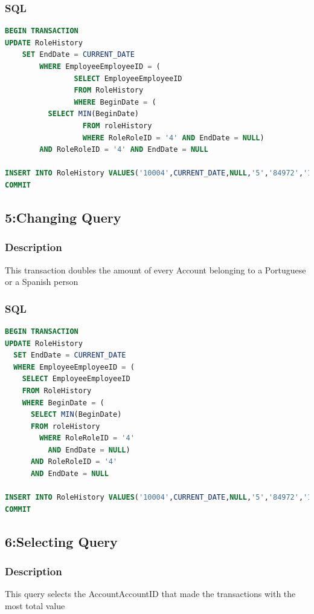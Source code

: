 \documentclass[a4paper, 10pt]{article}
\begin{document}
\subsubsection{SQL}
\begin{lstlisting}[language=SQL]
BEGIN TRANSACTION
UPDATE RoleHistory
	SET EndDate = CURRENT_DATE
		WHERE EmployeeEmployeeID = (
				SELECT EmployeeEmployeeID 
				FROM RoleHistory
				WHERE BeginDate = (
          SELECT MIN(BeginDate)
				  FROM roleHistory
				  WHERE RoleRoleID = '4' AND EndDate = NULL)
        AND RoleRoleID = '4' AND EndDate = NULL

INSERT INTO RoleHistory VALUES('10004',CURRENT_DATE,NULL,'5','84972','16516');
COMMIT
\end{lstlisting}

\subsection{5:Changing Query}
\subsubsection{Description}
This transaction doubles the amount of every Account belonging to a Portuguese or a Spanish person

\subsubsection{SQL}
\begin{lstlisting}[language=SQL]
BEGIN TRANSACTION 
UPDATE RoleHistory 
  SET EndDate = CURRENT_DATE 
  WHERE EmployeeEmployeeID = (
    SELECT EmployeeEmployeeID 
    FROM RoleHistory 
    WHERE BeginDate = ( 
      SELECT MIN(BeginDate) 
      FROM roleHistory 
        WHERE RoleRoleID = '4' 
          AND EndDate = NULL) 
      AND RoleRoleID = '4' 
      AND EndDate = NULL 

INSERT INTO RoleHistory VALUES('10004',CURRENT_DATE,NULL,'5','84972','16516');
COMMIT
\end{lstlisting}

\subsection{6:Selecting Query}
\subsubsection{Description}
This query selects the AccountAccountID that made the transactions with the most total value
\end{document}
